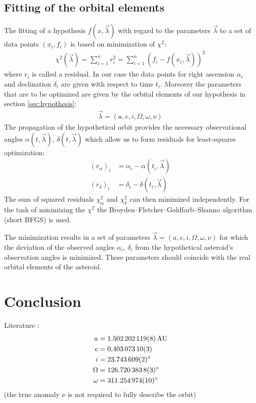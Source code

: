 \documentclass[11pt, a4paper]{article}
\numberwithin{equation}{section}
\begin{document}
\subsection{Fitting of the orbital elements}
The fitting of a hypothesis $f(x, \vec{\lambda})$ with regard to the parameters $\vec{\lambda}$ to a set of data points $(x_i, f_i)$ is based on minimization of $\chi^2$:
\begin{align}
	\chi^2(\vec{\lambda}) = \sum_{i = 1}^{n} r_i^2 = \sum_{i = 1}^{n} \left( f_i - f(x_i, \vec{\lambda}) \right)^2
\end{align}
where $r_i$ is called a residual.
In our case the data points for right ascension $\alpha_i$ and declination $\delta_i$ are given with respect to time $t_i$.
Moreover the parameters that are to be optimized are given by the orbital elements of our hypothesis in section \ref{sec:hypothesis}:
\begin{align}
	\vec{\lambda} = (a, e, i, \Omega, \omega, \nu)
\end{align}
The propagation of the hypothetical orbit provides the necessary observational angles $\alpha(t, \vec{\lambda})$, $\delta(t, \vec{\lambda})$ which allow us to form residuals for least-squares optimization:
\begin{align}
	(r_\alpha)_i &= \alpha_i - \alpha(t_i, \vec{\lambda}) \\
	(r_\delta)_i &= \delta_i - \delta(t_i, \vec{\lambda})
\end{align}
The sum of squared residuals $\chi_\alpha^2$ and $\chi_\delta^2$ can then minimized independently.
For the task of minimizing the $\chi^2$ the Broyden–Fletcher–Goldfarb–Shanno algorithm (short BFGS) is used.

The minimization results in a set of parameters $\vec{\lambda} = (a, e, i, \Omega, \omega, \nu)$ for which the deviation of the observed angles $\alpha_i$, $\delta_i$ from the hypothetical asteroid's observation angles is minimized.
These parameters should coincide with the real orbital elements of the asteroid.

\section{Conclusion}




Literature \cite{JPL}:
\begin{align*}
	a &= \SI{1.502202119 +- 0.000000008}{AU} \\
	e &= \num{0.40307310 +-0.00000003} \\
	i &= \SI{23.743609 +- 0.000002}{\degree} \\
	\Omega &= \SI{126.7203838 +- 0.0000003}{\degree} \\
	\omega &= \SI{311.254974 +- 0.000010}{\degree} \\
\end{align*}
(the true anomaly $\nu$ is not required to fully describe the orbit)
\end{document}
